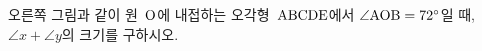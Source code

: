 \noindent\begin{minipage}[t]{0.58\linewidth}\vspace{0pt}\raggedright 오른쪽 그림과 같이 원~$\mathrm{O}$에 내접하는 오각형~$\mathrm{ABCDE}$에서 $\angle\mathrm{AOB}=72^\circ$일 때, $\angle x+\angle y$의 크기를 구하시오.\end{minipage}\hfill\begin{minipage}[t]{0.4\linewidth}\vspace{0pt}\centering \resizebox{\ifdim\width>\linewidth\linewidth\else\width\fi}{!}{}\end{minipage}\par
